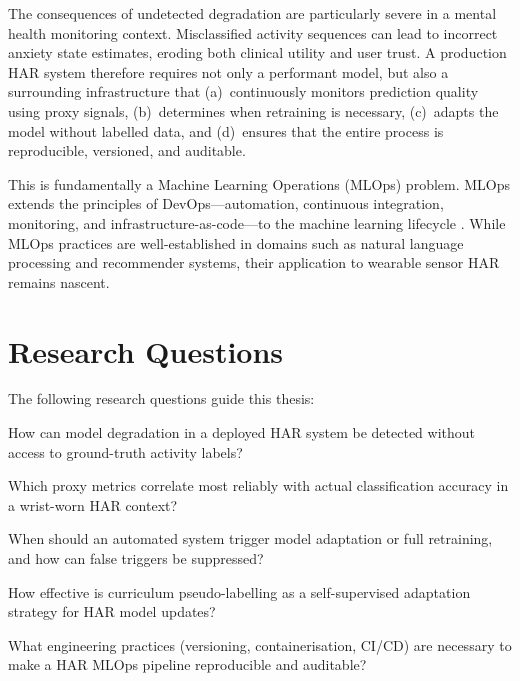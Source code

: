 The consequences of undetected degradation are particularly severe in a mental
health monitoring context.
Misclassified activity sequences can lead to incorrect anxiety state estimates,
eroding both clinical utility and user trust.
A production HAR system therefore requires not only a performant model, but
also a surrounding infrastructure that
(a)~continuously monitors prediction quality using proxy signals,
(b)~determines when retraining is necessary,
(c)~adapts the model without labelled data, and
(d)~ensures that the entire process is reproducible, versioned, and auditable.

This is fundamentally a Machine Learning Operations (MLOps) problem.
MLOps extends the principles of DevOps---automation, continuous integration,
monitoring, and infrastructure-as-code---to the machine learning lifecycle
\citep{sculley2015hidden}.
While MLOps practices are well-established in domains such as natural language
processing and recommender systems, their application to wearable sensor HAR
remains nascent.

\section{Research Questions}
\label{sec:rqs}

The following research questions guide this thesis:

\begin{description}[leftmargin=2cm, labelwidth=1.5cm]
  \item[RQ\,1] How can model degradation in a deployed HAR system be detected
               without access to ground-truth activity labels?
  \item[RQ\,2] Which proxy metrics correlate most reliably with actual
               classification accuracy in a wrist-worn HAR context?
  \item[RQ\,3] When should an automated system trigger model adaptation or
               full retraining, and how can false triggers be suppressed?
  \item[RQ\,4] How effective is curriculum pseudo-labelling as a self-supervised
               adaptation strategy for HAR model updates?
  \item[RQ\,5] What engineering practices (versioning, containerisation,
               CI/CD) are necessary to make a HAR MLOps pipeline
               reproducible and auditable?
\end{description}

